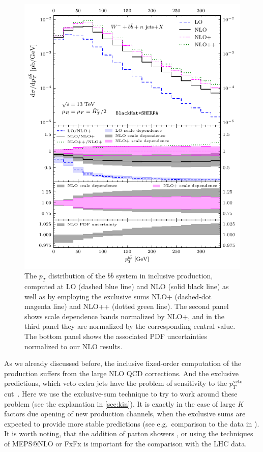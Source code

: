 \begin{figure}[ht]
  \centering
  \includegraphics[clip,scale=1]{plots/excl_ptbb_v4}
  \caption{The $p_T$ distribution of the $b\bar{b}$ system in inclusive \Wbbm{} production,
    computed at LO (dashed blue line) and NLO (solid black line) as well as
    by employing the exclusive sums NLO+ (dashed-dot magenta line)
    and NLO++ (dotted green line).
    The second panel shows scale dependence bands normalized by NLO+,
    and in the third panel they are normalized by the corresponding
    central value. The bottom panel shows the associated PDF uncertainties
    normalized to our NLO results.}
  \label{fig_Wmnjptbb}
\end{figure}

As we already discussed before, the inclusive fixed-order computation
of the \Wbb{} production suffers from the large NLO QCD corrections.
And the exclusive predictions, which veto extra jets have the problem of sensitivity
to the $p_T^\mathrm{veto}$ cut~\cite{Tackmann:2012bt}. 
Here we use the exclusive-sum technique \cite{ESums}
to try to work around these problem (see the explanation in \cref{sec:kin}).
It is exactly in the case of large $K$ factors due opening of new production channels, when
the exclusive sums are expected to provide more stable predictions (see e.g.\ comparison to the data in \cite{Aad:2014qxa,ATLAS:ratio2017}). 
It is worth noting, that the addition of parton showers \cite{Luisoni:2015mpa},
or using the techniques of MEPS@NLO \cite{Hoeche:2012yf} or FxFx \cite{Frederix:2012ps}
is important for the comparison with the LHC data.


